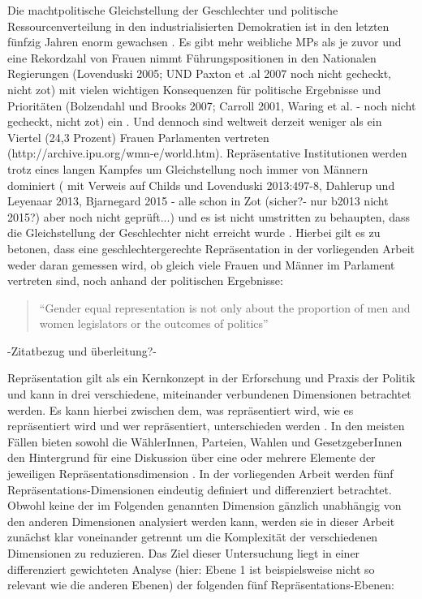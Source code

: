 \documentclass[12pt, 
    twoside=false, 
    bibliography=totoc, 
    numbers=endperiod, 
    headings=normal, 
    toc=chapterentrydotfill
    ]{scrbook}
\begin{document}
Die machtpolitische Gleichstellung der Geschlechter und politische Ressourcenverteilung in den industrialisierten Demokratien ist in den letzten fünfzig Jahren enorm gewachsen \parencite[318]{coffe_2010}. Es gibt mehr weibliche MPs als je zuvor und eine Rekordzahl von Frauen nimmt Führungspositionen in den Nationalen Regierungen (Lovenduski 2005; UND Paxton et .al 2007 noch nicht gecheckt, nicht zot) mit vielen wichtigen Konsequenzen für politische Ergebnisse und Prioritäten (Bolzendahl und Brooks 2007; Carroll 2001, Waring et al. - noch nicht gecheckt, nicht zot) ein \parencite[318]{coffe_2010}. Und dennoch sind weltweit derzeit weniger als ein Viertel (24,3 Prozent) Frauen Parlamenten vertreten (http://archive.ipu.org/wmn-e/world.htm). Repräsentative Institutionen werden trotz eines langen Kampfes um Gleichstellung noch immer von Männern dominiert \parencites [149]{celis_2018}[497 f.]{childs_2013}{dahlerup_2013 mit leyenaar} ( mit Verweis auf Childs und Lovenduski 2013:497-8, Dahlerup und Leyenaar 2013, Bjarnegard 2015 - alle schon in Zot (sicher?- nur b2013 nicht 2015?) aber noch nicht geprüft...) und es ist nicht umstritten zu behaupten, dass die Gleichstellung der Geschlechter nicht erreicht wurde \parencite[150]{celis_2018}. Hierbei gilt es zu betonen, dass eine geschlechtergerechte Repräsentation in der vorliegenden Arbeit weder daran gemessen wird, ob gleich viele Frauen und Männer im Parlament vertreten sind, noch anhand der politischen Ergebnisse:

\begin{quote}
     
 \enquote{Gender equal representation is not only about the proportion of men and women legislators or the
outcomes of politics}\parencite[197]{erikson_2018}
 \end{quote}

-Zitatbezug und überleitung?- 

Repräsentation gilt als ein Kernkonzept in der Erforschung und Praxis der Politik und kann in drei verschiedene, miteinander verbundenen Dimensionen betrachtet werden. Es kann hierbei zwischen dem, was repräsentiert wird, wie es repräsentiert wird und wer repräsentiert, unterschieden werden \parencite[557]{galligan_2007}. In den meisten Fällen bieten sowohl die WählerInnen, Parteien, Wahlen und GesetzgeberInnen den Hintergrund für eine Diskussion über eine oder mehrere Elemente der jeweiligen Repräsentationsdimension \parencite[557]{galligan_2007}.
In der vorliegenden Arbeit werden fünf Repräsentations-Dimensionen eindeutig definiert und differenziert betrachtet. Obwohl keine der im Folgenden genannten Dimension gänzlich unabhängig von den anderen Dimensionen analysiert werden kann, werden sie in dieser Arbeit zunächst klar voneinander getrennt um die Komplexität der verschiedenen Dimensionen zu reduzieren. Das Ziel dieser Untersuchung liegt in einer differenziert gewichteten Analyse (hier: Ebene 1 ist beispielsweise nicht so relevant wie die anderen Ebenen) der folgenden fünf Repräsentations-Ebenen: 
\end{document}
